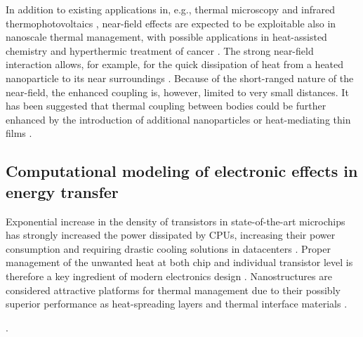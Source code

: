 In addition to existing applications in, e.g., thermal microscopy \cite{majumdar99,muller-hirsch99,kittel05,kittel08} and infrared thermophotovoltaics \cite{dimatteo01,narayanaswamy03,laroche06}, near-field effects are expected to be exploitable also in nanoscale thermal management, with possible applications in heat-assisted chemistry \cite{cao07,adleman09} and hyperthermic treatment of cancer \cite{vanderzee02}. The strong near-field interaction allows, for example, for the quick dissipation of heat from a heated nanoparticle to its near surroundings \cite{mulet01,domingues05}. Because of the short-ranged nature of the near-field, the enhanced coupling is, however, limited to very small distances. It has been suggested that thermal coupling between bodies could be further enhanced by the introduction of additional nanoparticles  \cite{benabdallah11,messina13} or heat-mediating thin films \cite{zheng11,messina12}. 

\subsection{Computational modeling of electronic effects in energy transfer}
\label{sec:intro_electrons}

Exponential increase in the density of transistors in state-of-the-art microchips has strongly increased the power dissipated by CPUs, increasing their power consumption and requiring drastic cooling solutions in datacenters \cite{pop10}. Proper management of the unwanted heat at both chip and individual transistor level is therefore a key ingredient of modern electronics design \cite{moore14}. Nanostructures are considered attractive platforms for thermal management due to their possibly superior performance as heat-spreading layers and thermal interface materials \cite{moore14}. 

.  

